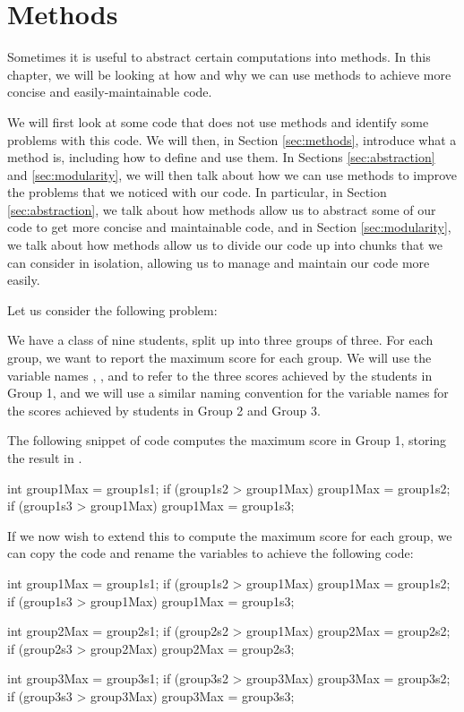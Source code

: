 \chapter{Methods}


Sometimes it is useful to abstract certain computations into methods.
In this chapter, we will be looking at how and why we can use methods to
achieve more concise and easily-maintainable code.

We will first look at some code that does not use methods and identify some
problems with this code. We will then, in Section \ref{sec:methods},
introduce what a method is, including how to define and use them.
In Sections \ref{sec:abstraction} and \ref{sec:modularity}, we will
then talk about how we can use methods to improve the problems that
we noticed with our code. In particular, in Section \ref{sec:abstraction},
we talk about how methods allow us to abstract some of our code to get
more concise and maintainable code, and in Section \ref{sec:modularity},
we talk about how methods allow us to divide our code up into chunks
that we can consider in isolation, allowing us to manage and maintain
our code more easily.

Let us consider the following problem:

We have a class of nine students, split up into three groups of three.
For each group, we want to report the maximum score for each group.
We will use the variable names , , and 
to refer to the three scores achieved by the students in Group 1, and we will use
a similar naming convention for the variable names for the scores achieved by
students in Group 2 and Group 3.

The following snippet of code computes the maximum score in Group 1, storing
the result in .
\begin{code}
int group1Max = group1s1;
if (group1s2 > group1Max) {
  group1Max = group1s2; 
}
if (group1s3 > group1Max) {
  group1Max = group1s3; 
}
\end{code}

If we now wish to extend this to compute the maximum score for each group,
we can copy the code and rename the variables to achieve the following
code:
\begin{code}
int group1Max = group1s1;
if (group1s2 > group1Max) {
  group1Max = group1s2; 
}
if (group1s3 > group1Max) {
  group1Max = group1s3; 
}

int group2Max = group2s1;
if (group2s2 > group1Max) {
  group2Max = group2s2; 
}
if (group2s3 > group2Max) {
  group2Max = group2s3; 
}

int group3Max = group3s1;
if (group3s2 > group3Max) {
  group3Max = group3s2; 
}
if (group3s3 > group3Max) {
  group3Max = group3s3; 
}
\end{code}

